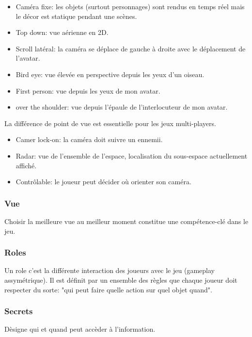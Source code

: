 \begin{itemize}
\item Cam\'era fixe: les objets (surtout personnages) sont rendus en temps r\'eel mais le d\'ecor est statique pendant une sc\`enes.
\item Top down: vue a\'erienne en 2D.
\item Scroll lat\'eral: la cam\'era se d\'eplace de gauche \`a droite avec le d\'eplacement de l'avatar.
\item Bird eye: vue \'elev\'ee en perspective depuis les yeux d'un oiseau.
\item First person: vue depuis les yeux de mon avatar.
\item over the shoulder: vue depuis l'\'epaule de l'interlocuteur de mon avatar.
\end{itemize}

La diff\'erence de point de vue est essentielle pour les jeux multi-players.

\begin{itemize}
\item Camer lock-on: la cam\'era doit suivre un ennemii.
\item Radar: vue de l'ensemble de l'espace, localisation du sous-espace actuellement affich\'e.
\item Contr\^olable: le joueur peut d\'ecider o\`u orienter son cam\'era.
\end{itemize}

\subsubsection{Vue}

Choisir la meilleure vue au meilleur moment constitue une comp\'etence-cl\'e dans le jeu.

\subsubsection{Roles}

Un role c'est la diff\'erente interaction des joueurs avec le jeu (gameplay assym\'etrique). Il est d\'efinit par un ensemble des r\`egles que chaque joueur doit respecter du sorte: "qui peut faire quelle action sur quel objet quand".

\subsubsection{Secrets}

D\`esigne qui et quand peut acc\`eder \`a l'information.

